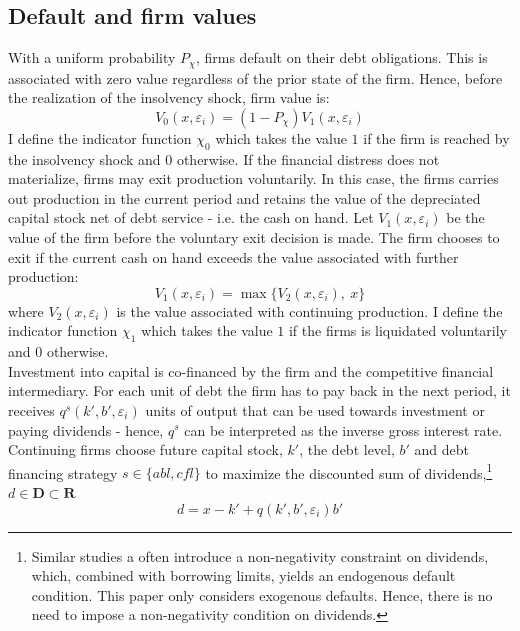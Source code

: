 \documentclass[12pt]{article}
\begin{document}
\subsection{Default and firm values \label{defaults}}
With a uniform probability $P_\chi$, firms default on their debt obligations. This is associated with zero value regardless of the prior state of the firm. Hence, before the realization of the insolvency shock, firm value is: 
\begin{equation} \label{eq:V_0}
V_0(x,\varepsilon_i) = (1-P_\chi) V_1(x,\varepsilon_i)
\end{equation}
I define the indicator function $\chi_0$ which takes the value $1$ if the firm is reached by the insolvency shock and 0 otherwise. If the financial distress does not materialize, firms may exit production voluntarily. In this case, the firms carries out production in the current period and retains the value of the depreciated capital stock net of debt service - i.e. the cash on hand. Let $V_1(x,\varepsilon_i)$ be the value of the firm before the voluntary exit decision is made. The firm chooses to exit if the current cash on hand exceeds the value associated with further production:
\begin{equation} \label{eq:V_1}
V_1(x,\varepsilon_i) = \max \Big\{ V_2(x,\varepsilon_i), \ x \Big\}
\end{equation} 
where $V_2(x,\varepsilon_i)$ is the value associated with continuing production. I define the indicator function $\chi_1$ which takes the value $1$ if the firms is liquidated voluntarily and 0 otherwise. \vspace{2mm} \\
Investment into capital is co-financed by the firm and the competitive financial intermediary. For each unit of debt the firm has to pay back in the next period, it receives $ q^s(k',b',\varepsilon_i)$ units of output that can be used towards investment or paying dividends - hence, $q^s$ can be interpreted as the inverse gross interest rate. Continuing firms choose future capital stock, $k'$, the debt level, $b'$ and debt financing strategy $ s \in \{abl, cfl \}$ to maximize the discounted sum of dividends,\footnote{Similar studies a often introduce a non-negativity constraint on dividends, which, combined with borrowing limits, yields an endogenous default condition. This paper only considers exogenous defaults. Hence, there is no need to impose a non-negativity condition on dividends.} $d \in \mathbf{D} \subset \mathbf{R}$ 
\begin{equation} \label{eq:dividends}
d = x - k' +  q(k',b',\varepsilon_i)b'
\end{equation} 
\end{document}
